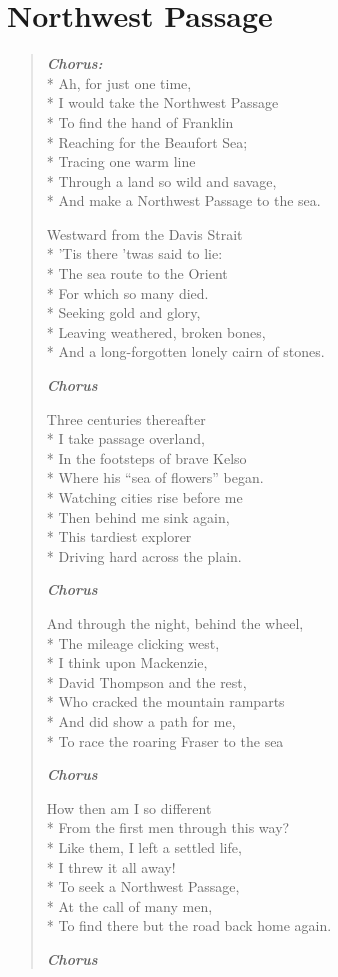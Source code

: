 \documentclass[9pt,twoside]{extarticle}
\newenvironment{xverse}{
	\begin{verse}
	\fontsize{8.5}{10.5}\selectfont
	}
	{
	\end{verse}
	\penalty 0
}
\newcommand{\chorusdef}{\textbf{\emph{Chorus:}}\\*}
\newcommand{\chorusmark}[1][1]{%
\vspace{-0.5\stanzaskip}%
\textbf{\emph{Chorus \ifthenelse{\equal{#1}{1}}{}{$\times$ #1}}}%
\vspace{-0.5\stanzaskip}%
}
\begin{document}
\section{Northwest Passage}

\begin{xverse}
\chorusdef
Ah, for just one time, \\*
I would take the Northwest Passage \\*
To find the hand of Franklin \\*
Reaching for the Beaufort Sea; \\*
Tracing one warm line \\*
Through a land so wild and savage, \\*
And make a Northwest Passage to the sea.

Westward from the Davis Strait \\*
’Tis there ’twas said to lie: \\*
The sea route to the Orient \\*
For which so many died. \\*
Seeking gold and glory, \\*
Leaving weathered, broken bones, \\*
And a long-forgotten lonely cairn of stones.

\chorusmark

Three centuries thereafter \\*
I take passage overland, \\*
In the footsteps of brave Kelso \\*
Where his “sea of flowers” began. \\*
Watching cities rise before me \\*
Then behind me sink again, \\*
This tardiest explorer \\*
Driving hard across the plain.

\chorusmark

And through the night, behind the wheel, \\*
The mileage clicking west, \\*
I think upon Mackenzie, \\*
David Thompson and the rest, \\*
Who cracked the mountain ramparts \\*
And did show a path for me, \\*
To race the roaring Fraser to the sea

\chorusmark

How then am I so different \\*
From the first men through this way? \\*
Like them, I left a settled life, \\*
I threw it all away! \\*
To seek a Northwest Passage, \\*
At the call of many men, \\*
To find there but the road back home again.

\chorusmark
\end{xverse}
\end{document}
